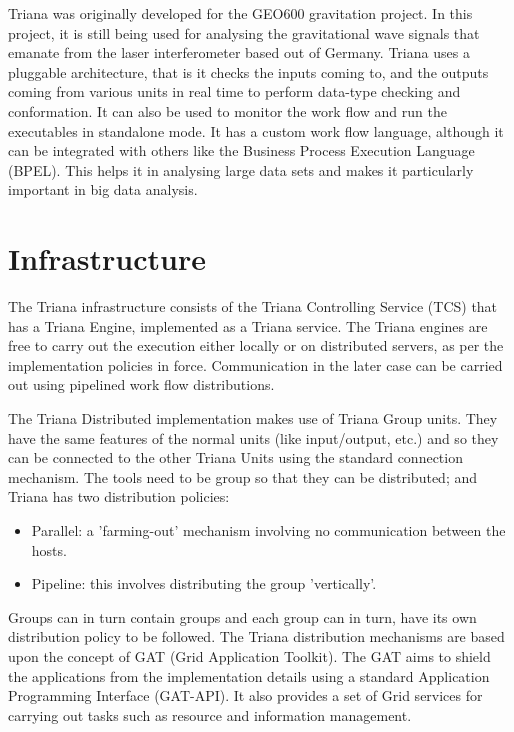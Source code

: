 \documentclass[9pt,twocolumn,twoside]{styles/osajnl}
\begin{document}
\cite{TrianaGEO600} Triana was originally developed for the GEO600
gravitation project.  In this project, it is still being used for
analysing the gravitational wave signals that emanate from the laser
interferometer based out of Germany.  \cite{TrianaDocumentation2}
Triana uses a pluggable architecture, that is it checks the inputs
coming to, and the outputs coming from various units in real time to
perform data-type checking and conformation.  It can also be used to
monitor the work flow and run the executables in standalone mode.
\cite{RMBDP-Book} It has a custom work flow language, although it can
be integrated with others like the Business Process Execution Language
(BPEL).  This helps it in analysing large data sets and makes it
particularly important in big data analysis.

\section{Infrastructure}

\cite{TrianaDocumentation2} The Triana infrastructure consists of the
Triana Controlling Service (TCS) that has a Triana Engine, implemented
as a Triana service.  The Triana engines are free to carry out the
execution either locally or on distributed servers, as per the
implementation policies in force.  Communication in the later case can
be carried out using pipelined work flow distributions.

The Triana Distributed implementation makes use of Triana Group units.
They have the same features of the normal units (like input/output,
etc.) and so they can be connected to the other Triana Units using the
standard connection mechanism.  The tools need to be group so that
they can be distributed; and Triana has two distribution policies:

\begin{itemize}

\item Parallel: a 'farming-out' mechanism involving no communication
  between the hosts.
\item Pipeline: this involves distributing the group 'vertically'.

\end{itemize}

Groups can in turn contain groups and each group can in turn, have its
own distribution policy to be followed.  The Triana distribution
mechanisms are based upon the concept of GAT (Grid Application
Toolkit).  The GAT aims to shield the applications from the
implementation details using a standard Application Programming
Interface (GAT-API).  It also provides a set of Grid services for
carrying out tasks such as resource and information management.
\end{document}
